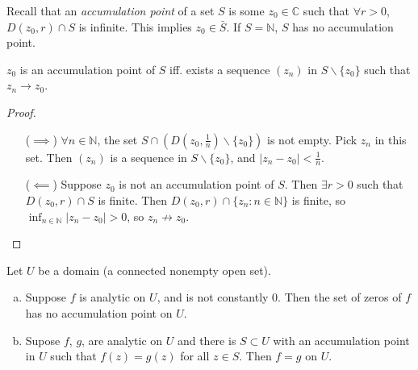 Recall that an \emph{accumulation point} of a set $S$ is some
$z_0 \in \mathbb{C}$ such that $\forall r > 0$,
$D(z_0, r) \cap S$ is infinite. This implies $z_0 \in \bar{S}$.
If $S = \mathbb{N}$, $S$ has no accumulation point.

\begin{lemma}
  $z_0$ is an accumulation point of $S$ iff. exists a
  sequence $(z_n)$ in $S \backslash \{ z_0 \}$ such that $z_n \to z_0$.
\end{lemma}

\begin{proof}
  \begin{itemize}
    \item[($\implies$)]{
      $\forall n \in \mathbb{N}$, the set
      $S \cap (D(z_0, \frac{1}{n}) \backslash \{ z_0 \})$ is not empty.
      Pick $z_n$ in this set. Then $(z_n)$ is a sequence in
      $S \backslash \{z_0\}$, and $|z_n - z_0| < \frac{1}{n}$.
    }
    \item[($\impliedby$)]{
      Suppose $z_0$ is not an accumulation point of $S$. Then
      $\exists r > 0$ such that $D(z_0, r) \cap S$ is finite.
      Then $D(z_0, r) \cap \{ z_n : n \in \mathbb{N} \}$ is
      finite, so $\inf_{n \in \mathbb{N}} |z_n - z_0| > 0$,
      so $z_n {\not \to} z_0$.
    }
  \end{itemize}
\end{proof}

\begin{theorem}
  Let $U$ be a domain (a connected nonempty open set).
  \begin{enumerate}[(a)]
    \item{
      Suppose $f$ is analytic on $U$, and is not constantly 0.
      Then the set of zeros of $f$ has no accumulation point on $U$.
    }
    \item{
      Supose $f$, $g$, are analytic on $U$ and there is $S \subset U$
      with an accumulation point in $U$ such that $f(z) = g(z)$
      for all $z \in S$. Then $f = g$ on $U$.
    }
  \end{enumerate}
\end{theorem}

